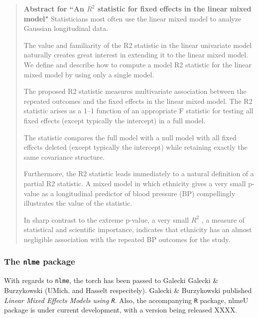 \documentclass[12pt, a4paper]{report}
\theoremstyle{plain}
\theoremstyle{definition}
\theoremstyle{remark}
\begin{document}
\begin{framed}
	
	\begin{quote}
		\textbf{Abstract for ``An $R^2$ statistic for fixed effects in the linear mixed model"}
		Statisticians most often use the linear mixed model to analyze Gaussian longitudinal data. 
		
		The value and familiarity of the R2 statistic in the linear univariate model naturally creates great interest in extending it to the linear mixed model. We define and describe how to compute a model R2 statistic for the linear mixed model by using only a single model. 
		
		The proposed R2 statistic measures multivariate association between the repeated outcomes and the fixed effects in the linear mixed model. The R2 statistic arises as a 1–1 function of an appropriate F statistic for testing all fixed effects (except typically the intercept) in a full model. 
		
		The statistic compares the full model with a null model with all fixed effects deleted (except typically the intercept) while retaining exactly the same covariance structure. 
		
		Furthermore, the R2 statistic leads immediately to a natural definition of a partial R2 statistic. A mixed model in which ethnicity gives a very small p-value as a longitudinal predictor of blood pressure (BP) compellingly illustrates the value of the statistic. 
		
		In sharp contrast to the extreme p-value, a very small $R^2$ , a measure of statistical and scientific importance, indicates that ethnicity has an almost negligible association with the repeated BP outcomes for the study.
	\end{quote}
\end{framed}

\subsubsection*{The \texttt{nlme} package}

With regards to \texttt{nlme}, the torch has been passed to Galecki Galecki \& Burzykowski (UMich. and Hasselt respecitely).  Galecki \& Burzykowski published \textit{Linear Mixed Effects Models using \texttt{R}}. 
Also, the accompanying \texttt{R} package, nlmeU package is under current development, with a version being released XXXX.
\end{document}
